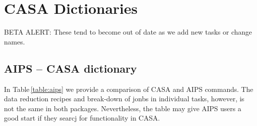 

\chapter[Appendix: CASA Dictionaries]{CASA Dictionaries}
\label{chapter:dict}

{BETA ALERT:} These tend to become out of date as we add new tasks
or change names.

\section{AIPS -- CASA dictionary}
\label{section:dict.aips}

In Table\,\ref{table:aips} we provide a comparison of CASA and AIPS
commands. The data reduction recipes and break-down of jonbs in
individual tasks, however, is not the same in both
packages. Nevertheless, the table may give AIPS users a good start if
they searcj for functionality in CASA. 

